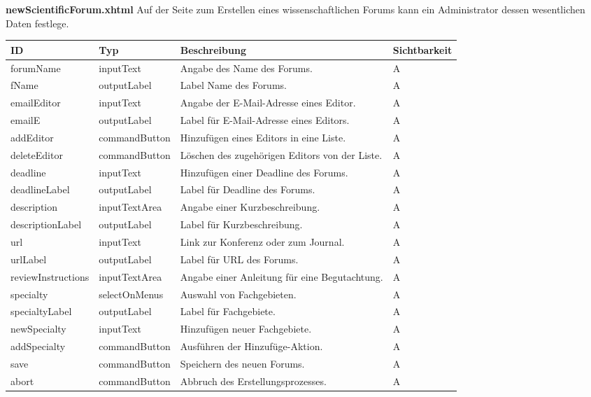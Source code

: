 \textbf{newScientificForum.xhtml} Auf der Seite zum Erstellen eines wissenschaftlichen Forums kann ein Administrator dessen wesentlichen Daten festlege.

\begin{tabular}[H]{|m{2cm}|m{3cm}|m{6cm}|m{2.5cm}|}
    \hline
    \textbf{ID} & \textbf{Typ} & \textbf{Beschreibung} & \textbf{Sichtbarkeit} \\
    \hline
    \hline
    forumName & inputText & Angabe des Name des Forums. & A\\
    \hline
    fName & outputLabel & Label Name des Forums. & A\\
    \hline
    emailEditor & inputText & Angabe der E-Mail-Adresse eines Editor. & A\\
    \hline
    emailE & outputLabel & Label für E-Mail-Adresse eines Editors. & A\\
    \hline
    addEditor & commandButton & Hinzufügen eines Editors in eine Liste. & A\\
    \hline
    deleteEditor & commandButton & Löschen des zugehörigen Editors von der Liste. & A\\
    \hline
    deadline & inputText & Hinzufügen einer Deadline des Forums. & A\\
    \hline
    deadlineLabel & outputLabel & Label für Deadline des Forums. & A\\
    \hline
    description & inputTextArea & Angabe einer Kurzbeschreibung. & A\\
    \hline
    descriptionLabel & outputLabel & Label für Kurzbeschreibung. & A\\
    \hline
    url & inputText & Link zur Konferenz oder zum Journal. & A\\
    \hline
    urlLabel & outputLabel & Label für URL des Forums. & A\\
    \hline
    reviewInstructions  & inputTextArea & Angabe einer Anleitung für eine Begutachtung. & A\\
    \hline
    specialty & selectOnMenus & Auswahl von Fachgebieten. & A\\
    \hline
    specialtyLabel & outputLabel & Label für Fachgebiete. & A\\
    \hline
    newSpecialty & inputText & Hinzufügen neuer Fachgebiete. & A\\
    \hline
    addSpecialty & commandButton & Ausführen der Hinzufüge-Aktion. & A\\
    \hline
    save & commandButton & Speichern des neuen Forums. & A\\
    \hline
    abort & commandButton & Abbruch des Erstellungsprozesses. & A\\
    \hline
\end{tabular}

